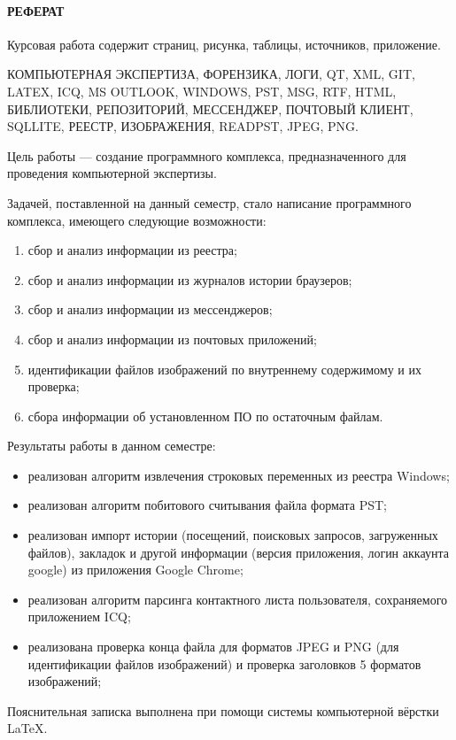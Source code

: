 \newpage
{}
\paragraph{\hfill РЕФЕРАТ \hfill}
Курсовая работа содержит  страниц,  рисунка,  таблицы,  источников,  приложение.

КОМПЬЮТЕРНАЯ ЭКСПЕРТИЗА, ФОРЕНЗИКА, ЛОГИ, QT, XML, GIT, LATEX, ICQ, MS OUTLOOK, WINDOWS, PST, MSG, RTF, HTML, БИБЛИОТЕКИ, РЕПОЗИТОРИЙ, МЕССЕНДЖЕР, ПОЧТОВЫЙ КЛИЕНТ, SQLLITE, РЕЕСТР, ИЗОБРАЖЕНИЯ, READPST, JPEG, PNG.

Цель работы --- создание программного комплекса, предназначенного для проведения компьютерной экспертизы.

Задачей, поставленной на данный семестр, стало написание программного комплекса, имеющего следующие возможности: 
\begin{enumerate}
\item сбор и анализ информации из реестра;
\item сбор и анализ информации из журналов истории браузеров;
\item сбор и анализ информации из мессенджеров;
\item сбор и анализ информации из почтовых приложений;
\item идентификации файлов изображений по внутреннему содержимому и их проверка;
\item сбора информации об установленном ПО по остаточным файлам.
\end{enumerate}

Результаты работы в данном семестре:

\begin{itemize}
\item реализован алгоритм извлечения строковых переменных из реестра Windows;
\item реализован алгоритм побитового считывания файла формата PST;
\item реализован импорт истории (посещений, поисковых запросов, загруженных файлов), закладок и 
другой информации (версия приложения, логин аккаунта google) из приложения Google Chrome;
\item реализован алгоритм парсинга контактного листа пользователя, сохраняемого приложением ICQ;
\item реализована проверка конца файла для форматов JPEG и PNG (для идентификации файлов изображений) и проверка заголовков 5 форматов изображений;
\end{itemize}

Пояснительная записка выполнена при помощи системы компьютерной вёрстки \LaTeX.
